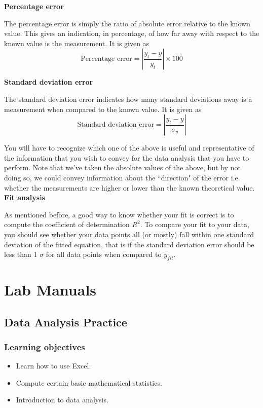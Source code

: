 \documentclass[12pt]{report}
\begin{document}
\noindent \textbf{Percentage error}

The percentage error is simply the ratio of absolute error relative to the known value. This gives an indication, in percentage, of how far away with respect to the known value is the measurement. It is given as
\begin{equation}
\text{Percentage error} = \left\rvert \frac{y_t - y}{y_t} \right\rvert \times 100
\end{equation}

\noindent \textbf{Standard deviation error}

The standard deviation error indicates how many standard deviations away is a measurement when compared to the known value. It is given as
\begin{equation}
\text{Standard deviation error} = \left\rvert \frac{y_t - y}{\sigma_y} \right\rvert
\end{equation}

You will have to recognize which one of the above is useful and representative of the information that you wish to convey for the data analysis that you have to perform. Note that we've taken the absolute values of the above, but by not doing so, we could convey information about the ``direction" of the error i.e. whether the measurements are higher or lower than the known theoretical value.\\

\noindent \large \textbf{Fit analysis} \normalsize

As mentioned before, a good way to know whether your fit is correct is to compute the coefficient of determination $R^2$. To compare your fit to your data, you should see whether your data points all (or mostly) fall within one standard deviation of the fitted equation, that is if the standard deviation error should be less than 1 $\sigma$ for all data points when compared to $y_{fit}$.


{}
\part*{Lab Manuals} \label{Part:Labs}

\chapter{Data Analysis Practice}
\section{Learning objectives}
\begin{itemize}
\item Learn how to use Excel.
\item Compute certain basic mathematical statistics.
\item Introduction to data analysis.
\end{itemize}
\end{document}
